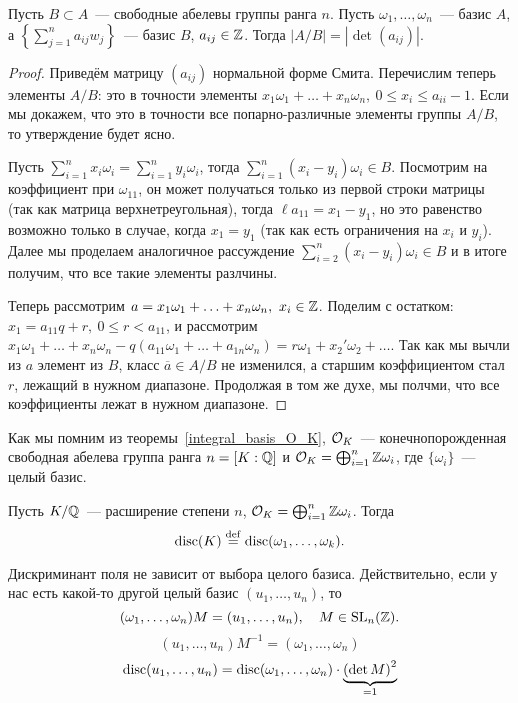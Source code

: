 		\begin{lemma}\label{free_abelian_groups_prop} 
			Пусть $B \subset A$~--- свободные абелевы группы ранга $n$. Пусть $\omega_1, \ldots, \omega_n$~--- базис $A$, а $\left\{\sum_{j = 1}^{n} a_{i j} w_{j}\right\}$~--- базис $B$, $a_{i j} \in \Z$. Тогда $|A / B| = |\det(a_{i j})|$.
		\end{lemma}
		\begin{proof}
			Приведём матрицу $(a_{i j})$ нормальной форме Смита. Перечислим теперь элементы $A/B$: это в точности элементы $x_1 \omega_1 + \ldots + x_n \omega_n, \ 0 \le x_i \le a_{ii} - 1$. Если мы докажем, что это в точности все попарно-различные элементы группы $A/B$, то утверждение будет ясно. 

			Пусть $\sum_{i = 1}^{n} x_i \omega_i = \sum_{i = 1}^{n} y_i \omega_i$, тогда $\sum_{i = 1}^{n}(x_i - y_i) \omega_i \in B$. Посмотрим на коэффициент при $\omega_{11}$, он может получаться только из первой строки матрицы (так как матрица верхнетреугольная), тогда   $\ell a_{11} = x_{1} - y_{1}$, но это равенство возможно только в случае, когда $x_1 = y_1$ (так как есть ограничения на $x_i$ и $y_i$). Далее мы проделаем аналогичное рассуждение $\sum_{i = 2}^{n} (x_i - y_i) \omega_i \in B$ и в итоге получим, что все такие элементы разлчины. 

			Теперь рассмотрим $a = x_1 \omega_1 + \ldots + x_n \omega_n, \ x_i \in \Z$. Поделим с остатком: $x_1 = a_{11}q + r, \ 0 \le r  < a_{11}$, и рассмотрим $x_{1} \omega_{1} + \ldots + x_n \omega_n - q(a_{11}\omega_1 + \ldots + a_{1n}\omega_n) = r\omega_1 + x_{2}'\omega_{2} + \ldots$.  Так как мы вычли из $a$ элемент из $B$, класс $\overline{a} \in A/B$ не изменился, а старшим коэффициентом стал $r$, лежащий в нужном диапазоне. Продолжая в том же духе, мы полчми, что все коэффициенты лежат в нужном диапазоне. 
		\end{proof}

		Как мы помним из теоремы~\ref{integral_basis_O_K}, $\cO_{K}$~--- конечнопорожденная свободная абелева группа ранга $n = [K : \Q]$ и $\cO_{K} = \bigoplus_{i = 1}^{n} \Z \omega_{i}$, где $\{ \omega_i \}$~--- целый базис. 

		\begin{definition} 
			Пусть $K/\Q$~--- расширение степени $n$,  $\cO_{K} = \bigoplus_{i = 1}^{n} \Z \omega_{i}$. Тогда 
			\[
				\disc(K) \eqdef \disc\lr*{\omega_{1}, \ldots, \omega_{k}}.
			\]
		\end{definition}
	
		\begin{remark}
			Дискриминант поля не зависит от выбора целого базиса. Действительно, если у нас есть какой-то другой целый базис $(u_1, \ldots, u_n)$, то 
			\[
				(\omega_{1}, \ldots, \omega_{n})M = (u_1, \ldots, u_n), \quad M \in \mathrm{SL}_{n}(\Z).
			\]
			\[
				 (u_1, \ldots, u_n)M^{-1} = (\omega_{1}, \ldots, \omega_{n}) 
			\]
			\[
				\disc(u_1, \ldots, u_n) = \disc(\omega_1, \ldots, \omega_n) \cdot \underbrace{\lr*{\det{M}}^{2}}_{= 1}
			\]
		\end{remark}

